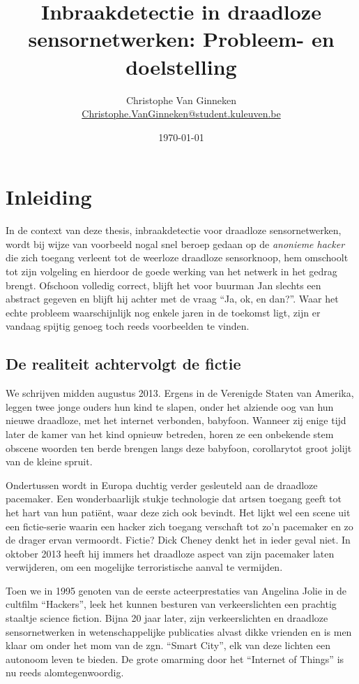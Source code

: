 \documentclass[12pt,a4paper,draft]{article}
\author{Christophe Van Ginneken\\\url{Christophe.VanGinneken@student.kuleuven.be}}
\title{Inbraakdetectie in draadloze sensornetwerken: Probleem- en doelstelling}
\date{\today}
\begin{document}
\maketitle

\section*{Inleiding}

In de context van deze thesis, inbraakdetectie voor draadloze sensornetwerken,
wordt bij wijze van voorbeeld nogal snel beroep gedaan op de \emph{anonieme
hacker} die zich toegang verleent tot de weerloze draadloze sensorknoop, hem
omschoolt tot zijn volgeling en hierdoor de goede werking van het netwerk in
het gedrag brengt. Ofschoon volledig correct, blijft het voor buurman Jan
slechts een abstract gegeven en blijft hij achter met de vraag ``Ja, ok, en
dan?''. Waar het echte probleem waarschijnlijk nog enkele jaren in de toekomst
ligt, zijn er vandaag spijtig genoeg toch reeds voorbeelden te vinden.

\subsection*{De realiteit achtervolgt de fictie}

We schrijven midden augustus 2013. Ergens in de Verenigde Staten van Amerika,
leggen twee jonge ouders hun kind te slapen, onder het alziende oog van hun
nieuwe draadloze, met het internet verbonden, babyfoon. Wanneer zij enige tijd
later de kamer van het kind opnieuw betreden, horen ze een onbekende stem
obscene woorden ten berde brengen langs deze babyfoon, corollarytot groot
jolijt van de kleine spruit.

Ondertussen wordt in Europa duchtig verder gesleuteld aan de draadloze
pacemaker. Een wonderbaarlijk stukje technologie dat artsen toegang geeft tot
het hart van hun pati\"ent, waar deze zich ook bevindt. Het lijkt wel een scene
uit een fictie-serie waarin een hacker zich toegang verschaft tot zo'n
pacemaker en zo de drager ervan vermoordt. Fictie? Dick Cheney denkt het in
ieder geval niet. In oktober 2013 heeft hij immers het draadloze aspect van
zijn pacemaker laten verwijderen, om een mogelijke terroristische aanval te
vermijden.

Toen we in 1995 genoten van de eerste acteerprestaties van Angelina Jolie in de
cultfilm ``Hackers'', leek het kunnen besturen van verkeerslichten een prachtig
staaltje science fiction. Bijna 20 jaar later, zijn verkeerslichten en
draadloze sensornetwerken in wetenschappelijke publicaties alvast dikke
vrienden en is men klaar om onder het mom van de zgn. ``Smart City'', elk van
deze lichten een autonoom leven te bieden. De grote omarming door het
``Internet of Things'' is nu reeds alomtegenwoordig.
\end{document}

